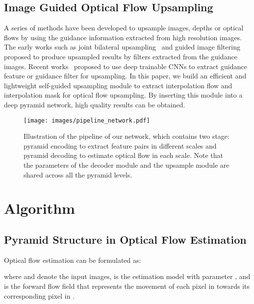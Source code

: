 \documentclass[final]{cvpr}
\begin{document}
\subsection{Image Guided Optical Flow Upsampling} \label{sec:related_image_guided_upsample}
A series of methods have been developed to upsample images, depths or optical flows by using the guidance information extracted from high resolution images. The early works such as joint bilateral upsampling~\cite{kopf2007JBU} and guided image filtering~\cite{he2010guided} proposed to produce upsampled results by filters extracted from the guidance images. Recent works~\cite{li2016fastfgi,wu2018fast,su2019pac} proposed to use deep trainable CNNs to extract guidance feature or guidance filter for upsampling. In this paper, we build an efficient and lightweight self-guided upsampling module to extract interpolation flow and interpolation mask for optical flow upsampling. By inserting this module into a deep pyramid network, high quality results can be obtained. 

\begin{figure*}
	\centering
	\texttt{[image: images/pipeline\_network.pdf]}
	\caption{Illustration of the pipeline of our network, which contains two stage: pyramid encoding to extract feature pairs in different scales and pyramid decoding to estimate optical flow in each scale. Note that the parameters of the decoder module and the upsample module are shared across all the pyramid levels. }\label{fig:algo_our_pipeline}
\end{figure*}

\section{Algorithm}\label{sec:algo}
\subsection{Pyramid Structure in Optical Flow Estimation}\label{sec:algo_pyramid_structure}
Optical flow estimation can be formulated as: 

where  and  denote the input images,  is the estimation model with parameter , and  is the forward flow field that represents the movement of each pixel in  towards its corresponding pixel in . 
\end{document}
